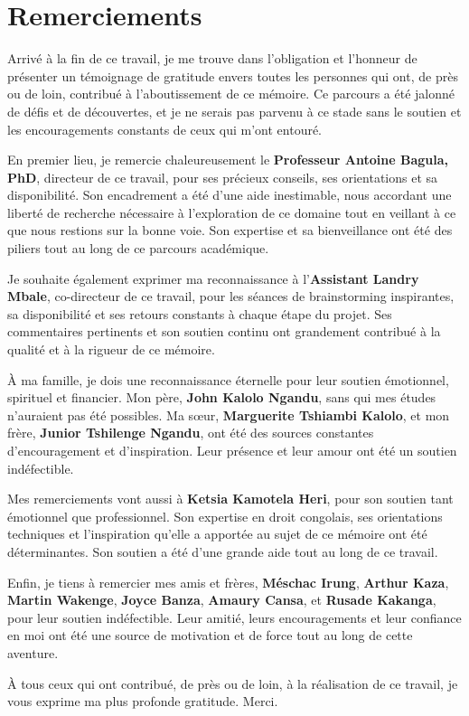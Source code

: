 

\begingroup

\let\clearpage\relax
\let\cleardoublepage\relax
\let\cleardoublepage\relax
{}
\chapter*{Remerciements}

Arrivé à la fin de ce travail, je me trouve dans l'obligation et l'honneur de présenter un témoignage de gratitude envers toutes les personnes qui ont, de près ou de loin, contribué à l'aboutissement de ce mémoire. Ce parcours a été jalonné de défis et de découvertes, et je ne serais pas parvenu à ce stade sans le soutien et les encouragements constants de ceux qui m'ont entouré.

En premier lieu, je remercie chaleureusement le \textbf{Professeur Antoine Bagula, PhD}, directeur de ce travail, pour ses précieux conseils, ses orientations et sa disponibilité. Son encadrement a été d’une aide inestimable, nous accordant une liberté de recherche nécessaire à l'exploration de ce domaine tout en veillant à ce que nous restions sur la bonne voie. Son expertise et sa bienveillance ont été des piliers tout au long de ce parcours académique.

Je souhaite également exprimer ma reconnaissance à l'\textbf{Assistant Landry Mbale}, co-directeur de ce travail, pour les séances de brainstorming inspirantes, sa disponibilité et ses retours constants à chaque étape du projet. Ses commentaires pertinents et son soutien continu ont grandement contribué à la qualité et à la rigueur de ce mémoire.

À ma famille, je dois une reconnaissance éternelle pour leur soutien émotionnel, spirituel et financier. Mon père, \textbf{John Kalolo Ngandu}, sans qui mes études n'auraient pas été possibles. Ma sœur, \textbf{Marguerite Tshiambi Kalolo}, et mon frère, \textbf{Junior Tshilenge Ngandu}, ont été des sources constantes d'encouragement et d'inspiration. Leur présence et leur amour ont été un soutien indéfectible.

Mes remerciements vont aussi à \textbf{Ketsia Kamotela Heri}, pour son soutien tant émotionnel que professionnel. Son expertise en droit congolais, ses orientations techniques et l'inspiration qu'elle a apportée au sujet de ce mémoire ont été déterminantes. Son soutien a été d'une grande aide tout au long de ce travail.

Enfin, je tiens à remercier mes amis et frères, \textbf{Méschac Irung}, \textbf{Arthur Kaza}, \textbf{Martin Wakenge}, \textbf{Joyce Banza}, \textbf{Amaury Cansa}, et \textbf{Rusade Kakanga}, pour leur soutien indéfectible. Leur amitié, leurs encouragements et leur confiance en moi ont été une source de motivation et de force tout au long de cette aventure.

À tous ceux qui ont contribué, de près ou de loin, à la réalisation de ce travail, je vous exprime ma plus profonde gratitude. Merci.

\endgroup